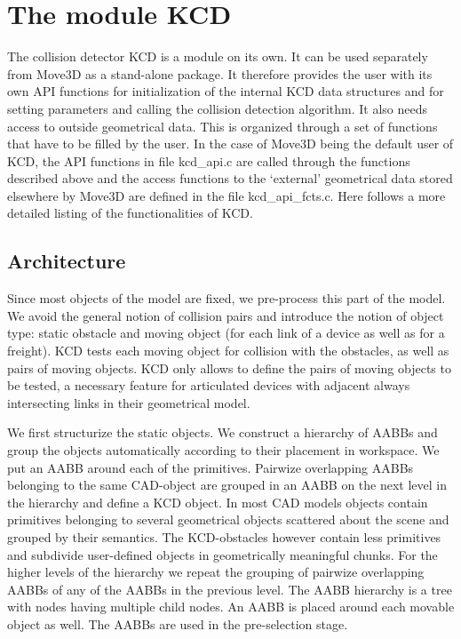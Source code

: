 \section{The module KCD}
The collision detector KCD is a module on its own. It can be used
separately from Move3D as a stand-alone package. It therefore provides
the user with its own API functions for initialization of the internal
KCD data structures and for setting parameters and calling the
collision detection algorithm. It also needs access to outside 
geometrical data. This is organized through a set of functions that
have to be filled by the user. In the case of Move3D being the default
user of KCD, the API functions in file kcd\_api.c are called through 
the functions described above and the access functions to the 
`external' geometrical data stored elsewhere by Move3D are defined 
in the file kcd\_api\_fcts.c. Here follows a more detailed listing
of the functionalities of KCD.

\subsection{Architecture}
Since most objects of the model are fixed, we pre-process this
part of the model. We avoid the general notion of collision pairs and 
introduce the notion of object type: static obstacle and moving 
object (for each link of a device as well as for a freight).
KCD tests each moving object for collision with the obstacles,
as well as pairs of moving objects. KCD only allows to define the
pairs of moving objects to be tested, a necessary feature for
articulated devices with adjacent always intersecting links in
their geometrical model.

We first structurize the static objects. We construct a hierarchy of 
AABBs and group the objects automatically 
according to their placement in workspace. We put an AABB around
each of the primitives. Pairwize overlapping AABBs belonging 
to the same CAD-object are grouped in an AABB on the next level 
in the hierarchy and define a KCD object. In most CAD models 
objects contain primitives belonging
to several geometrical objects scattered about the scene and 
grouped by their semantics. The KCD-obstacles 
however contain less primitives and subdivide user-defined 
objects in geometrically meaningful chunks. For the higher levels
of the hierarchy we repeat the grouping of pairwize overlapping AABBs
of any of the AABBs in the previous level.
The AABB hierarchy is a tree with nodes
having multiple child nodes. An AABB 
is placed around each movable object as well. The AABBs are used in
the pre-selection stage.

